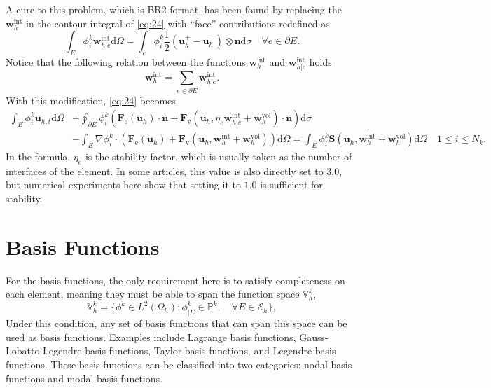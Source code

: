 \documentclass{develop-note}
\begin{document}
A cure to this problem, which is BR2 format, has been found by replacing the $\mathbf{w}_{h}^{\mathrm{int}}$ in the contour integral of \autoref{eq:24} with ``face'' contributions redefined as
\begin{equation}
  \int_{E}\phi_{i}^{k}\mathbf{w}_{h|e}^{\mathrm{int}}\mathrm{d}\Omega=\int_{e}\phi_{i}^{k}\dfrac{1}{2}(\mathbf{u}_{h}^{+}-\mathbf{u}_{h}^{-})\otimes\mathbf{n}\mathrm{d}\sigma\quad\forall e \in\partial E.
\end{equation}
Notice that the following relation between the functions $\mathbf{w}_{h}^{\mathrm{int}}$ and $\mathbf{w}_{h|e}^{\mathrm{int}}$ holds
\begin{equation}
  \mathbf{w}_{h}^{\mathrm{int}}=\sum_{e\in\partial E}\mathbf{w}_{h|e}^{\mathrm{int}}.
\end{equation}
With this modification, \autoref{eq:24} becomes
\begin{equation}
  \label{eq:27}
  \begin{aligned}
    \int_{E}\phi_{i}^{k}\mathbf{u}_{h,t}\mathrm{d}\Omega &+\oint_{\partial E}\phi_{i}^{k}(\mathbf{F}_{\mathrm{e}}(\mathbf{u}_{h})\cdot\mathbf{n}+\mathbf{F}_{\mathrm{v}}(\mathbf{u}_{h},\eta_{e}\mathbf{w}_{h|e}^{\mathrm{int}}+\mathbf{w}_{h}^{\mathrm{vol}})\cdot\mathbf{n})\mathrm{d}\sigma\\
    &-\int_{E}\nabla\phi_{i}^{k}\cdot(\mathbf{F}_{\mathrm{e}}(\mathbf{u}_{h})+\mathbf{F}_{\mathrm{v}}(\mathbf{u}_{h},\mathbf{w}_{h}^{\mathrm{int}}+\mathbf{w}_{h}^{\mathrm{vol}}))\mathrm{d}\Omega=\int_{E}\phi_{i}^{k}\mathbf{S}(\mathbf{u}_{h},\mathbf{w}_{h}^{\mathrm{int}}+\mathbf{w}_{h}^{\mathrm{vol}})\mathrm{d}\Omega\quad 1\leqslant i\leqslant N_{k}.
  \end{aligned}
\end{equation}
In the formula, $\eta_{e}$ is the stability factor, which is usually taken as the number of interfaces of the element\cite{bassiImplicitHighorderDiscontinuous2007}. In some articles, this value is also directly set to $3.0$, but numerical experiments here show that setting it to $1.0$ is sufficient for stability.

\section{Basis Functions}

For the basis functions, the only requirement here is to satisfy completeness on each element, meaning they must be able to span the function space $\mathbb{V}_{h}^{k}$,
\begin{equation}
  \mathbb{V}_{h}^{k}=\{\phi^{k}\in L^{2}(\Omega_{h}):\phi^{k}_{|E}\in\mathbb{P}^{k},\quad\forall E\in\mathscr{E}_{h}\},
\end{equation}
Under this condition, any set of basis functions that can span this space can be used as basis functions. Examples include Lagrange basis functions, Gauss-Lobatto-Legendre basis functions, Taylor basis functions, and Legendre basis functions. These basis functions can be classified into two categories: nodal basis functions and modal basis functions.
\end{document}
